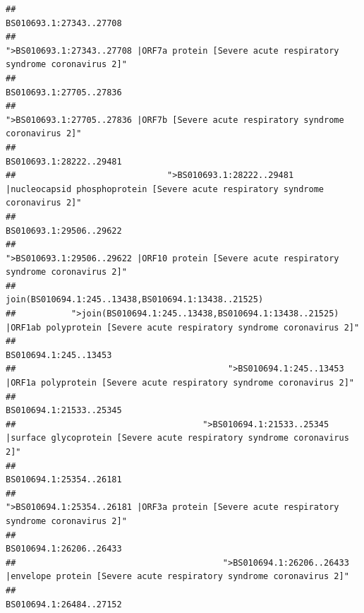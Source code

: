 \documentclass[
]{article}
\begin{document}
\begin{verbatim}
##                                                                                                                BS010693.1:27343..27708 
##                                            ">BS010693.1:27343..27708 |ORF7a protein [Severe acute respiratory syndrome coronavirus 2]" 
##                                                                                                                BS010693.1:27705..27836 
##                                                    ">BS010693.1:27705..27836 |ORF7b [Severe acute respiratory syndrome coronavirus 2]" 
##                                                                                                                BS010693.1:28222..29481 
##                              ">BS010693.1:28222..29481 |nucleocapsid phosphoprotein [Severe acute respiratory syndrome coronavirus 2]" 
##                                                                                                                BS010693.1:29506..29622 
##                                            ">BS010693.1:29506..29622 |ORF10 protein [Severe acute respiratory syndrome coronavirus 2]" 
##                                                                                    join(BS010694.1:245..13438,BS010694.1:13438..21525) 
##           ">join(BS010694.1:245..13438,BS010694.1:13438..21525) |ORF1ab polyprotein [Severe acute respiratory syndrome coronavirus 2]" 
##                                                                                                                  BS010694.1:245..13453 
##                                          ">BS010694.1:245..13453 |ORF1a polyprotein [Severe acute respiratory syndrome coronavirus 2]" 
##                                                                                                                BS010694.1:21533..25345 
##                                     ">BS010694.1:21533..25345 |surface glycoprotein [Severe acute respiratory syndrome coronavirus 2]" 
##                                                                                                                BS010694.1:25354..26181 
##                                            ">BS010694.1:25354..26181 |ORF3a protein [Severe acute respiratory syndrome coronavirus 2]" 
##                                                                                                                BS010694.1:26206..26433 
##                                         ">BS010694.1:26206..26433 |envelope protein [Severe acute respiratory syndrome coronavirus 2]" 
##                                                                                                                BS010694.1:26484..27152 

\end{verbatim}
\end{document}
